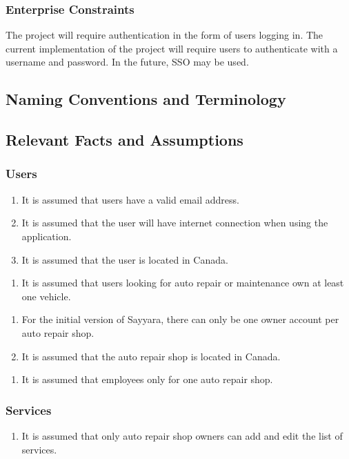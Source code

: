 \documentclass[12pt]{article}
\begin{document}
\subsubsection{Enterprise Constraints}
The project will require authentication in the form of users logging in. The current implementation
of the project will require users to authenticate with a username and password. In the future, SSO
may be used.

\subsection{Naming Conventions and Terminology}

\subsection{Relevant Facts and Assumptions}
\subsubsection{Users}
\begin{enumerate}
	\item It is assumed that users have a valid email address.
	\item It is assumed that the user will have internet connection when using the application.
	\item It is assumed that the user is located in Canada.
\end{enumerate}
\begin{enumerate}
	\item It is assumed that users looking for auto repair or maintenance own at least one vehicle.
\end{enumerate}
\begin{enumerate}
	\item For the initial version of Sayyara, there can only be one owner account per auto repair shop.
	\item It is assumed that the auto repair shop is located in Canada.
\end{enumerate}
\begin{enumerate}
	\item It is assumed that employees only for one auto repair shop.
\end{enumerate}
\subsubsection{Services}
\begin{enumerate}
	\item It is assumed that only auto repair shop owners can add and edit the list of services.
\end{enumerate}
\end{document}
